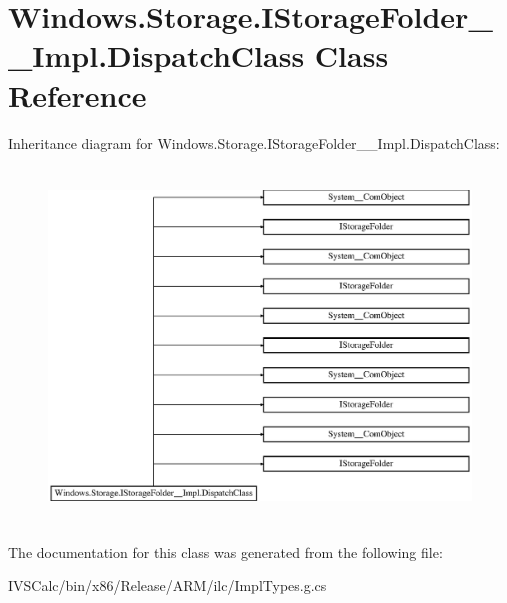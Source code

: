 \hypertarget{class_windows_1_1_storage_1_1_i_storage_folder_____impl_1_1_dispatch_class}{}\section{Windows.\+Storage.\+I\+Storage\+Folder\+\_\+\+\_\+\+Impl.\+Dispatch\+Class Class Reference}
\label{class_windows_1_1_storage_1_1_i_storage_folder_____impl_1_1_dispatch_class}
Inheritance diagram for Windows.\+Storage.\+I\+Storage\+Folder\+\_\+\+\_\+\+Impl.\+Dispatch\+Class\+:\begin{figure}[H]
\begin{center}
\leavevmode
\includegraphics[height=9.447853cm]{class_windows_1_1_storage_1_1_i_storage_folder_____impl_1_1_dispatch_class}
\end{center}
\end{figure}


The documentation for this class was generated from the following file\+:\begin{DoxyCompactItemize}
\item 
I\+V\+S\+Calc/bin/x86/\+Release/\+A\+R\+M/ilc/Impl\+Types.\+g.\+cs\end{DoxyCompactItemize}
